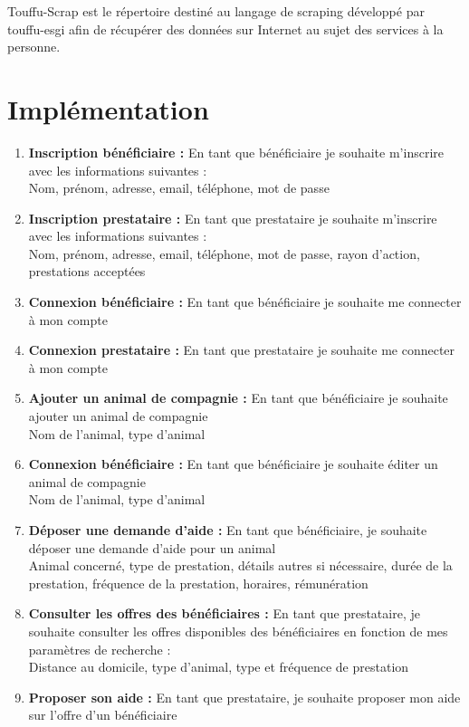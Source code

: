 \documentclass[conference]{IEEEtran}
\begin{document}
Touffu-Scrap est le répertoire destiné au langage de scraping développé par touffu-esgi afin de récupérer des données sur Internet au sujet des services à la personne.\\

\section{Implémentation}

\begin{enumerate}
	\item \textbf{Inscription bénéficiaire :} En tant que bénéficiaire je souhaite m'inscrire avec les informations suivantes :
	\\Nom, prénom, adresse, email, téléphone, mot de passe
	\item \textbf{Inscription prestataire :} En tant que prestataire je souhaite m'inscrire avec les informations suivantes :
	\\Nom, prénom, adresse, email, téléphone, mot de passe, rayon d'action, prestations acceptées
	\item \textbf{Connexion bénéficiaire :} En tant que bénéficiaire je souhaite me connecter à mon compte
	\item \textbf{Connexion prestataire :} En tant que prestataire je souhaite me connecter à mon compte
	\item \textbf{Ajouter un animal de compagnie :} En tant que bénéficiaire je souhaite ajouter un animal de compagnie
	\\Nom de l'animal, type d'animal
	\item \textbf{Connexion bénéficiaire :} En tant que bénéficiaire je souhaite éditer un animal de compagnie
	\\Nom de l'animal, type d'animal
	\item \textbf{Déposer une demande d'aide :} En tant que bénéficiaire, je souhaite déposer une demande d'aide pour un animal
	\\Animal concerné, type de prestation, détails autres si nécessaire, durée de la prestation, fréquence de la prestation, horaires, rémunération
	\item \textbf{Consulter les offres des bénéficiaires :} En tant que prestataire, je souhaite consulter les offres disponibles des bénéficiaires en fonction de mes paramètres de recherche :
	\\Distance au domicile, type d'animal, type et fréquence de prestation
	\item \textbf{Proposer son aide :} En tant que prestataire, je souhaite proposer mon aide sur l'offre d'un bénéficiaire

\end{enumerate}
\end{document}
